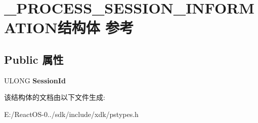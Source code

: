 \hypertarget{struct___p_r_o_c_e_s_s___s_e_s_s_i_o_n___i_n_f_o_r_m_a_t_i_o_n}{}\section{\+\_\+\+P\+R\+O\+C\+E\+S\+S\+\_\+\+S\+E\+S\+S\+I\+O\+N\+\_\+\+I\+N\+F\+O\+R\+M\+A\+T\+I\+O\+N结构体 参考}
\label{struct___p_r_o_c_e_s_s___s_e_s_s_i_o_n___i_n_f_o_r_m_a_t_i_o_n}
\subsection*{Public 属性}
\begin{DoxyCompactItemize}
\item 
\mbox{\label{struct___p_r_o_c_e_s_s___s_e_s_s_i_o_n___i_n_f_o_r_m_a_t_i_o_n_a6578d20cdec9197083ce5a538ec74e66}} 
U\+L\+O\+NG {\bfseries Session\+Id}
\end{DoxyCompactItemize}


该结构体的文档由以下文件生成\+:\begin{DoxyCompactItemize}
\item 
E\+:/\+React\+O\+S-\/0../sdk/include/xdk/pstypes.\+h\end{DoxyCompactItemize}

